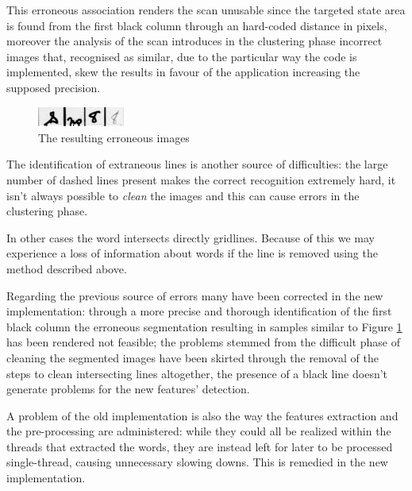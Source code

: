 This erroneous association renders the scan unusable since the targeted state area is found from the first black column through an hard-coded distance in pixels, moreover the analysis of the scan introduces in the clustering phase incorrect images that, recognised as similar, due to the particular way the code is implemented, skew the results in favour of the application increasing the supposed precision. 

\begin{figure}[!htpb]
\centering
\includegraphics[width=0.26\textwidth]{images/wrongColumn.jpg}
\caption{The resulting erroneous images}
\label{err}
\end{figure} 

The identification of extraneous lines is another source of difficulties: the large number of dashed lines present makes the correct recognition extremely hard, it isn't always possible to \emph{clean} the images and this can cause errors in the clustering phase.

In other cases the word intersects directly gridlines. Because of this we may experience a loss of information about words if the line is removed using the method described above.



Regarding the previous source of errors many have been corrected in the new implementation:
through a more precise and thorough identification of the first black column the erroneous segmentation resulting in samples similar to Figure \ref{err} has been rendered not feasible; the problems stemmed from the difficult phase of cleaning the segmented images have been skirted through the removal of the steps to clean intersecting lines altogether, the presence of a black line doesn't generate problems for the new features' detection.

A problem of the old implementation is also the way the features extraction and the pre-processing are administered: while they could all be realized within the threads that extracted the words, they are instead left for later to be processed single-thread, causing unnecessary slowing downs. This is remedied in the new implementation. 